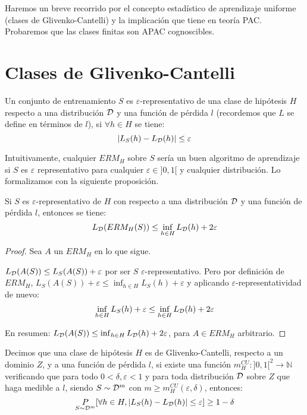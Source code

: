 Haremos un breve recorrido por el concepto estadístico de aprendizaje uniforme (clases de Glivenko-Cantelli) y la 
implicación que tiene en teoría PAC. Probaremos que las clases finitas son APAC cognoscibles.

\section{Clases de Glivenko-Cantelli}
\begin{definition}
 Un conjunto de entrenamiento $S$ es $\varepsilon$-representativo de una clase de hipótesis $H$ respecto a una
 distribución $\mathcal{D}$ y una función de pérdida $l$ (recordemos que $L$ se define en términos de $l$), 
 si $\forall h\in H$ se tiene:
 \[
   |L_S(h) - L_{\mathcal{D}}(h)| \le \varepsilon
 \]
\end{definition}

Intuitivamente, cualquier $ERM_H$ sobre $S$ sería un buen algoritmo de aprendizaje 
si $S$ es $\varepsilon$ representativo para cualquier $\varepsilon \in ]0,1[$ y cualquier distribución. 
Lo formalizamos con la siguiente proposición.

\begin{fact}
 Si $S$ es $\varepsilon$-representativo de $H$ con respecto a una distribución $\mathcal{D}$ y una función de 
 pérdida $l$, entonces se tiene:
 \[
   L_{\mathcal{D}}(ERM_H(S)) \le \inf_{h\in H} L_{\mathcal{D}}(h) + 2\varepsilon
 \]
 
 \label{fact:epsilon-rep}
\end{fact}

  \begin{proof}
   Sea $A$ un $ERM_H$ en lo que sigue.
   
   $L_{\mathcal{D}}(A(S)) \le L_S(A(S)) + \varepsilon$ por ser $S$ $\varepsilon$-representativo. Pero por definición de 
   $ERM_H$, $L_S(A(S)) + \varepsilon \le \inf_{h\in H}L_S(h) + \varepsilon$ y aplicando
   $\varepsilon$-representatividad de nuevo:
   \[
     \inf_{h\in H} L_S(h) + \varepsilon \le \inf_{h\in H} L_{\mathcal{D}}(h) + 2\varepsilon
   \]
   
   En resumen: $L_{\mathcal{D}}(A(S)) \le \inf_{h\in H} L_{\mathcal{D}}(h) + 2\varepsilon$, para $A \in ERM_H$ arbitrario.
  \end{proof}


\begin{definition}
Decimos que una clase de hipótesis $H$ es de Glivenko-Cantelli, respecto a un dominio $Z$, y a 
una función de pérdida $l$, si existe una función ${m_{H}^{CU}: ]0,1[^2 \rightarrow \mathbb{N}}$ 
verificando que para todo $0 < \delta, \varepsilon < 1$ y para toda distribución $\mathcal{D}$ sobre $Z$ 
que haga medible a $l$, siendo $S\sim \mathcal{D}^m$ con $m \ge m_{H}^{CU}(\varepsilon, \delta)$, entonces:
\[
  \underset{S\sim \mathcal{D}^m}{P} [\forall h\in H, |L_S(h) - L_{\mathcal{D}}(h)| \le \varepsilon] \ge 1-\delta
\]
\end{definition}

